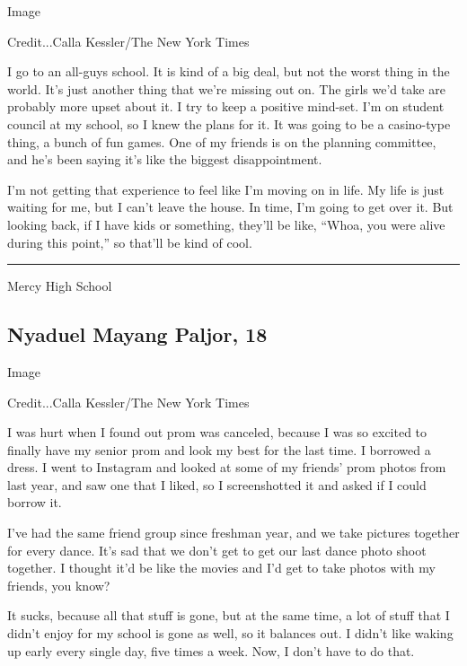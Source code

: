 Image

Credit...Calla Kessler/The New York Times

I go to an all-guys school. It is kind of a big deal, but not the worst
thing in the world. It's just another thing that we're missing out on.
The girls we'd take are probably more upset about it. I try to keep a
positive mind-set. I'm on student council at my school, so I knew the
plans for it. It was going to be a casino-type thing, a bunch of fun
games. One of my friends is on the planning committee, and he's been
saying it's like the biggest disappointment.

I'm not getting that experience to feel like I'm moving on in life. My
life is just waiting for me, but I can't leave the house. In time, I'm
going to get over it. But looking back, if I have kids or something,
they'll be like, ``Whoa, you were alive during this point,'' so that'll
be kind of cool.

\begin{center}\rule{0.5\linewidth}{\linethickness}\end{center}

Mercy High School

\hypertarget{nyaduel-mayang-paljor-18}{%
\subsection{Nyaduel Mayang Paljor, 18}\label{nyaduel-mayang-paljor-18}}

Image

Credit...Calla Kessler/The New York Times

I was hurt when I found out prom was canceled, because I was so excited
to finally have my senior prom and look my best for the last time. I
borrowed a dress. I went to Instagram and looked at some of my friends'
prom photos from last year, and saw one that I liked, so I screenshotted
it and asked if I could borrow it.

I've had the same friend group since freshman year, and we take pictures
together for every dance. It's sad that we don't get to get our last
dance photo shoot together. I thought it'd be like the movies and I'd
get to take photos with my friends, you know?

It sucks, because all that stuff is gone, but at the same time, a lot of
stuff that I didn't enjoy for my school is gone as well, so it balances
out. I didn't like waking up early every single day, five times a week.
Now, I don't have to do that.

